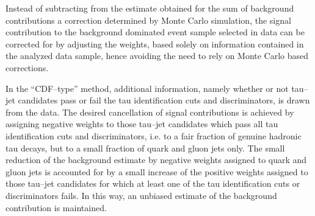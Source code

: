 
Instead of subtracting from the estimate obtained for the sum of background contributions
a correction determined by Monte Carlo simulation,
the signal contribution to the background dominated event sample selected in data can be corrected for
by adjusting the weights, based solely on information contained in the analyzed data sample,
hence avoiding the need to rely on Monte Carlo based corrections.

In the ``CDF--type'' method, additional information, namely whether or not tau--jet candidates
pass or fail the tau identification cuts and discriminators, is drawn from the data.
The desired cancellation of signal contributions is achieved by assigning negative weights to those tau--jet candidates 
which pass all tau identification cuts and discriminators, 
i.e. to a fair fraction of genuine hadronic tau decays, 
but to a small fraction of quark and gluon jets only.
The small reduction of the background estimate by negative weights assigned to quark and gluon jets 
is accounted for by a small increase of the positive weights assigned to those tau--jet candidates 
for which at least one of the tau identification cuts or discriminators fails.
In this way, an unbiased estimate of the background contribution is maintained.

